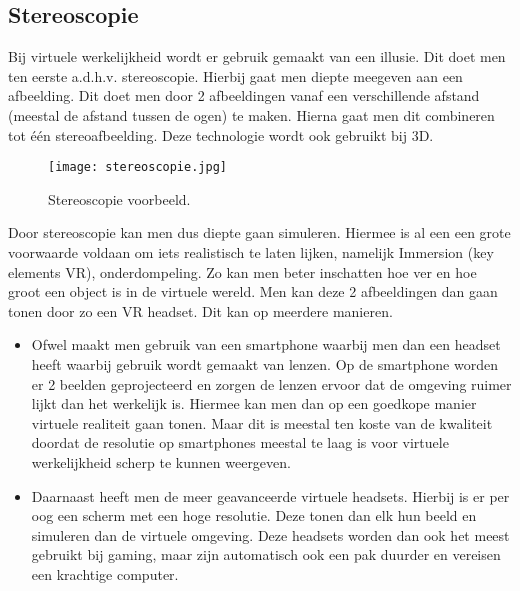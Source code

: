 \subsection{Stereoscopie}
Bij virtuele werkelijkheid wordt er gebruik gemaakt van een illusie. Dit doet men ten eerste a.d.h.v. stereoscopie. Hierbij gaat men diepte meegeven aan een afbeelding. Dit doet men door 2 afbeeldingen vanaf een verschillende afstand (meestal de afstand tussen de ogen) te maken. Hierna gaat men dit combineren tot één stereoafbeelding. Deze technologie wordt ook gebruikt bij 3D. 

\begin{figure}
	\centering
	\texttt{[image: stereoscopie.jpg]}
	\caption{Stereoscopie voorbeeld.}
	\label{fig:stereoscopie}
\end{figure}

Door stereoscopie kan men dus diepte gaan simuleren. Hiermee is al een een grote voorwaarde voldaan om iets realistisch te laten lijken, namelijk Immersion (key elements VR), onderdompeling. Zo kan men beter inschatten hoe ver en hoe groot een object is in de virtuele wereld. Men kan deze 2 afbeeldingen dan gaan tonen door zo een VR headset. Dit kan op meerdere manieren.
\begin{itemize}
	\item Ofwel maakt men gebruik van een smartphone waarbij men dan een headset heeft waarbij gebruik wordt gemaakt van lenzen. Op de smartphone worden er 2 beelden geprojecteerd en zorgen de lenzen ervoor dat de omgeving ruimer lijkt dan het werkelijk is. Hiermee kan men dan op een goedkope manier virtuele realiteit gaan tonen. Maar dit is meestal ten koste van de kwaliteit doordat de resolutie op smartphones meestal te laag is voor virtuele werkelijkheid scherp te kunnen weergeven.
	
	\item Daarnaast heeft men de meer geavanceerde virtuele headsets. Hierbij is er per oog een scherm met een hoge resolutie. Deze tonen dan elk hun beeld en simuleren dan de virtuele omgeving. Deze headsets worden dan ook het meest gebruikt bij gaming, maar zijn automatisch ook een pak duurder en vereisen een krachtige computer.
\end{itemize}

